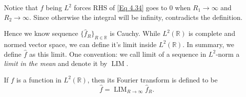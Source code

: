 Notice that $f$ being $L^2$ forces RHS of \ref{Eq 4.34} goes to $0$ when $R_1\to\infty$ and $R_2\to\infty$. Since otherwise the integral will be infinity, contradicts the definition.

Hence we know sequence $\{\hat{f}_R\}_{R\in\mathbb R}$ is Cauchy. While $L^2(\mathbb R)$ is complete and normed vector space, we can define it's limit inside $L^2(\mathbb R)$. In summary, we define $\hat{f}$ as this limit. One convention: we call limit of a sequence in $L^2$-norm a \textit{limit in the mean} and denote it by $\operatorname{LIM}$.
\begin{Definition}[Defintion 4.2.5.] 
    If $f$ is a function in $L^2(\mathbb R)$, then its Fourier transform is defined to be 
    \begin{equation*}
\hat{f}=\operatorname{LIM}_{R\to\infty}\hat{f}_R.
    \end{equation*}
\end{Definition}

